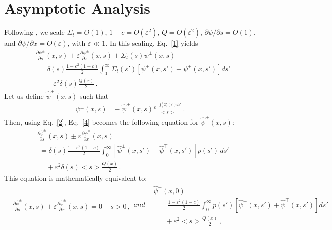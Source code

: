 \documentclass{anstrans}
\newcommand{\bl}{\big<}
\newcommand{\bg}{\big>}
\newcommand{\eps}{\varepsilon}
\begin{document}
\section{Asymptotic Analysis}
Following \cite{vas14a},  we scale $\Sigma_t = O(1)$, 
$ 1-c = O(\varepsilon^2) $, $Q=O(\varepsilon^2)$,  $\partial \psi / \partial s = O(1)$, and $\partial \psi/\partial x = O(\eps)$, with $\varepsilon \ll 1$. In this scaling, Eq.\ \eqref{1} yields
  \begin{align}
    &\frac{\partial \psi^\pm}{\partial s}  (x,s) 
      \pm \eps\frac{\partial\psi^\pm}{\partial x}(x, s)
       + \Sigma_t(s) \psi^\pm( x, s)   \label{4}\\
   & \,\,= \delta(s)\frac{1-\eps^2(1-c)}{2}\int_0^{\infty}\Sigma_t(s') 
      \left[\psi^\pm(x, s')+\psi^\mp(x,s')\right]ds'  \nonumber \\
     &\,\,\,\,\,\,\,\, + \varepsilon^2 \delta(s)\frac{Q(x)}{2} \,.
 \nonumber
  \end{align}
Let us define $\hat\psi^\pm(x, s)$ such that
  \begin{align}
   \psi^\pm( x,s) &\equiv 
          \hat\psi^\pm(x,s) \frac{e^{-\int_0^s \Sigma_t(s') ds'}}{\bl s\bg}\,.\nonumber
  \end{align}
Then, using Eq.\ \eqref{2}, Eq.\ \eqref{4} becomes the following equation for $\hat\psi^\pm(x, s)$:
  \begin{align}
    &\frac{\partial \hat\psi^\pm}{\partial s} (x,s) 
      \pm \varepsilon \frac{\partial\hat\psi^\pm}{\partial x}(x, s) \nonumber \\
   & \,\,= \delta(s)\frac{1-\eps^2(1-c)}{2} \int_0^{\infty} \left[
      \hat\psi^\pm(x, s')+\hat\psi^\mp(x,s')\right] p(s') \, ds'\nonumber\\
      & \,\,\,\,\,\,\,\,
      + \varepsilon^2 \delta(s) \bl s\bg \frac{Q(x)}{2} \,.\nonumber 
  \end{align}
This equation is mathematically equivalent to:
   \begin{subequations}\label{5}
   \begin{align}
      &\frac{\partial \hat\psi^\pm}{\partial s} (x,s) 
         \pm \varepsilon \frac{\partial\hat\psi^\pm}{\partial x}(x, s) = 0 \, \quad s > 0 \,,\label{5a}
         \end{align}
         and
         \begin{align}
       &\hat\psi^\pm(x, 0)  =\\
       &\,\,\,\,=\frac{1-\eps^2(1-c)}{2} \int_0^{\infty} p(s')
\left[\hat\psi^\pm(x ,s')+\hat\psi^\mp(x ,s')\right] ds'  \nonumber\\
         &\,\,\,\,\,\,\,\,\,\, + \varepsilon^2 \bl s\bg \frac{Q(x)}{2} \,,\nonumber
   \end{align}
   \end{subequations}
\end{document}
